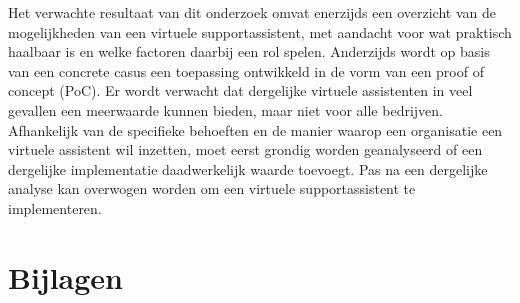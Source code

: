 \documentclass[dutch,dit,thesis]{hogentreport}
\begin{document}
Het verwachte resultaat van dit onderzoek omvat enerzijds een overzicht van de mogelijkheden van een virtuele supportassistent, met aandacht voor wat praktisch haalbaar is en welke factoren daarbij een rol spelen. Anderzijds wordt op basis van een concrete casus een toepassing ontwikkeld in de vorm van een proof of concept (PoC). Er wordt verwacht dat dergelijke virtuele assistenten in veel gevallen een meerwaarde kunnen bieden, maar niet voor alle bedrijven. Afhankelijk van de specifieke behoeften en de manier waarop een organisatie een virtuele assistent wil inzetten, moet eerst grondig worden geanalyseerd of een dergelijke implementatie daadwerkelijk waarde toevoegt. Pas na een dergelijke analyse kan overwogen worden om een virtuele supportassistent te implementeren.



\chapter{Bijlagen}







\backmatter{}

\setlength\bibitemsep{2pt} %
\printbibliography[heading=bibintoc]
\end{document}
